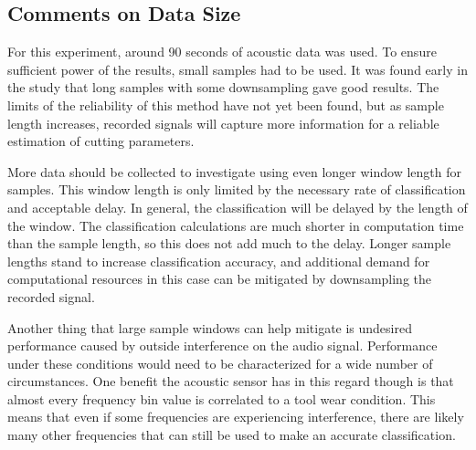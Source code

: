 \subsection{Comments on Data Size}

For this experiment, around 90 seconds of acoustic data was used. 
To ensure sufficient power of the results, small samples had to be used. 
It was found early in the study that long samples with some downsampling gave good results.
The limits of the reliability of this method have not yet been found, but as sample length increases,
recorded signals will capture more information for a reliable estimation of cutting parameters.

More data should be collected to investigate using even longer window length for samples.
This window length is only limited by the necessary rate of classification and acceptable delay.
In general, the classification will be delayed by the length of the window. 
The classification calculations are much shorter in computation time than the sample length, so this
does not add much to the delay.
Longer sample lengths stand to increase classification accuracy, and additional demand for computational
resources in this case can be mitigated by downsampling the recorded signal.

Another thing that large sample windows can help mitigate is undesired performance caused by outside interference
on the audio signal. Performance under these conditions would need to be characterized for a wide number of 
circumstances. One benefit the acoustic sensor has in this regard though is that almost every frequency
bin value is correlated to a tool wear condition. This means that even if some frequencies are
experiencing interference, there are likely many other frequencies that can still be used to make an accurate classification.

